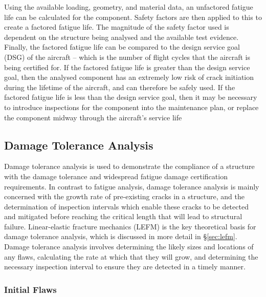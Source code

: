 Using the available loading, geometry, and material data, an unfactored fatigue life can be calculated for the component. Safety factors are then applied to this to create a factored fatigue life. The magnitude of the safety factor used is dependent on the structure being analysed and the available test evidence. Finally, the factored fatigue life can be compared to the design service goal (DSG) of the aircraft -- which is the number of flight cycles that the aircraft is being certified for. If the factored fatigue life is greater than the design service goal, then the analysed component has an extremely low risk of crack initiation during the lifetime of the aircraft, and can therefore be safely used. If the factored fatigue life is less than the design service goal, then it may be necessary to introduce inspections for the component into the maintenance plan, or replace the component midway through the aircraft's service life

\newpage
\subsection{Damage Tolerance Analysis}

Damage tolerance analysis is used to demonstrate the compliance of a structure with the damage tolerance and widespread fatigue damage certification requirements. In contrast to fatigue analysis, damage tolerance analysis is mainly concerned with the growth rate of pre-existing cracks in a structure, and the determination of inspection intervals which enable these cracks to be detected and mitigated before reaching the critical length that will lead to structural failure. Linear-elastic fracture mechanics (LEFM) is the key theoretical basis for damage tolerance analysis, which is discussed in more detail in \S\ref{sec:lefm}. Damage tolerance analysis involves determining the likely sizes and locations of any flaws, calculating the rate at which that they will grow, and determining the necessary inspection interval to ensure they are detected in a timely manner.

\subsubsection*{Initial Flaws}

